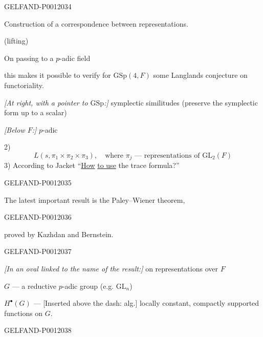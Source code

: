 \begin{GelfandAdjacentEvidence}{GELFAND-P001203}{4}


Construction of a correspondence between representations.

(lifting)

On passing to a $p$-adic field

this makes it possible to verify for \(\mathrm{GSp}(4,F)\) some Langlands conjecture on functoriality.

\textit{[At right, with a pointer to \(\mathrm{GSp}\):]} symplectic similitudes (preserve the symplectic form up to a scalar)

\textit{[Below \(F\):]} $p$-adic

2) 
\[
L(s,\pi_1\times\pi_2\times\pi_3),\quad
\text{where }\pi_j\text{ --- representations of }\mathrm{GL}_2(F)
\]
3) According to Jacket “\underline{How} \underline{to use} the trace formula?”
\end{GelfandAdjacentEvidence}
\begin{GelfandAdjacentEvidence}{GELFAND-P001203}{5}


The latest important result is the Paley--Wiener theorem,
\end{GelfandAdjacentEvidence}
\begin{GelfandAdjacentEvidence}{GELFAND-P001203}{6}

proved by Kazhdan and Bernstein.

\end{GelfandAdjacentEvidence}
\begin{GelfandAdjacentEvidence}{GELFAND-P001203}{7}


\textit{[In an oval linked to the name of the result:]} on representations over \(F\)

\(G\) --- a reductive $p$-adic group (e.g. \(\mathrm{GL}_n\))

\(H^{\bullet}(G)\) --- [Inserted above the dash: alg.] locally constant, compactly supported functions on \(G\).
\end{GelfandAdjacentEvidence}
\begin{GelfandAdjacentEvidence}{GELFAND-P001203}{8}

\end{GelfandAdjacentEvidence}
